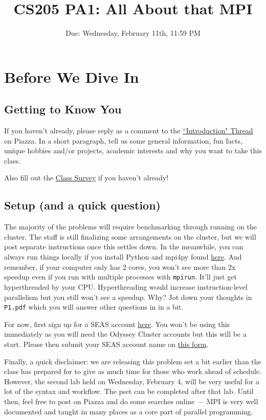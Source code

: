 \documentclass[12pt]{article}
\title{CS205 PA1: All About that MPI}
\date{Due: Wednesday, February 11th, 11:59 PM}
\begin{document}
\maketitle

\section*{Before We Dive In}

\subsection*{Getting to Know You}
If you haven't already, please reply as a comment to the \href{https://piazza.com/class/i2ca9aq68w6t4?cid=9}{``Introduction" Thread} on Piazza.  In a short paragraph, tell us some general information, fun facts, unique hobbies and/or projects, academic interests and why you want to take this class.

Also fill out the \href{http://goo.gl/forms/GauD9DBBDD}{Class Survey} if you haven't already!

\subsection*{Setup (and a quick question)}

The majority of the problems will require benchmarking through running on the cluster.  The staff is still finalizing some arrangements on the cluster, but we will post separate instructions once this settles down.  In the meanwhile, you can always run things locally if you install Python and mpi4py found \href{http://mpi4py.scipy.org/}{here}.  And remember, if your computer only has 2 cores, you won't see more than 2x speedup even if you run with multiple processes with \texttt{mpirun}.  It'll just get hyperthreaded by your CPU.  Hyperthreading would increase instruction-level parallelism but you still won't see a speedup.  Why?  Jot down your thoughts in \texttt{P1.pdf} which you will answer other questions in in a bit.

For now, first sign up for a SEAS account \href{https://password.seas.harvard.edu/itapps/apply/}{here}.  You won't be using this immediately as you will need the Odyssey Cluster accounts but this will be a start.  Please then submit your SEAS account name on \href{https://docs.google.com/forms/d/1q7c-OoFLE6Qe32AaWLq80KQhKlxaCYF7QyyyGCfPvws/viewform?usp=send_form}{this form}. 

Finally, a quick disclaimer: we are releasing this problem set a bit earlier than the class has prepared for to give as much time for those who work ahead of schedule.  However, the second lab held on Wednesday, February 4, will be very useful for a lot of the syntax and workflow.  The pset can be completed after that lab.  Until then, feel free to post on Piazza and do some searches online --- MPI is very well documented and taught in many places as a core part of parallel programming.
\end{document}
